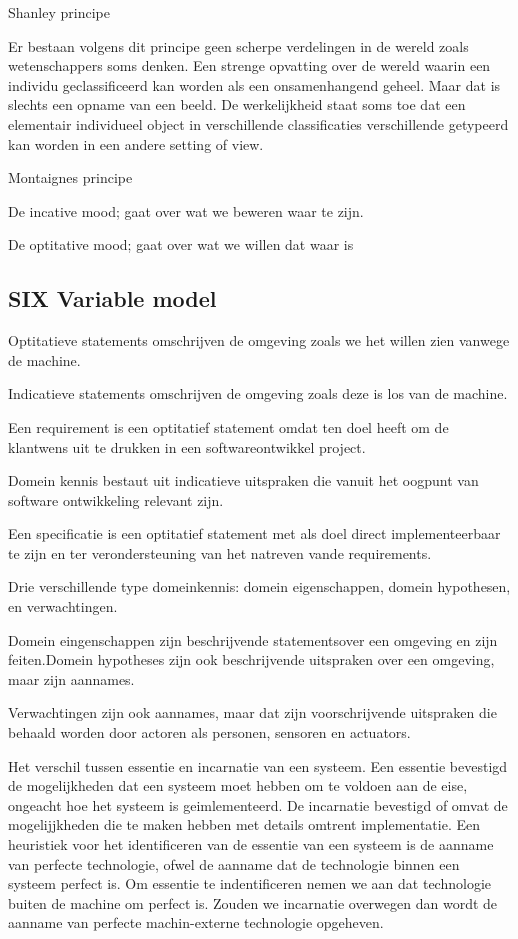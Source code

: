 Shanley principe 

Er bestaan volgens dit principe geen scherpe verdelingen in de wereld zoals wetenschappers soms denken. Een strenge opvatting over de wereld waarin een individu geclassificeerd kan worden als een onsamenhangend geheel. Maar dat is slechts een opname van een beeld. De werkelijkheid staat soms toe dat een elementair individueel object in verschillende classificaties verschillende getypeerd kan worden in een andere setting of view. 

Montaignes principe 

De incative mood; gaat over wat we beweren waar te zijn. 

De optitative mood; gaat over wat we willen dat waar is 
\subsection{SIX Variable model}
Optitatieve statements omschrijven de omgeving zoals we het willen zien vanwege de machine. 

Indicatieve statements omschrijven de omgeving zoals deze is los van de machine. 

Een requirement is een optitatief statement omdat ten doel heeft om de klantwens uit te drukken in een softwareontwikkel project. 

Domein kennis bestaut uit indicatieve uitspraken die vanuit het oogpunt van software ontwikkeling relevant zijn. 

Een specificatie is een optitatief statement met als doel direct implementeerbaar te zijn en ter verondersteuning van het natreven vande requirements. 

Drie verschillende type domeinkennis: domein eigenschappen, domein hypothesen, en verwachtingen. 

Domein eingenschappen  zijn beschrijvende statementsover een omgeving en zijn feiten.Domein hypotheses  zijn ook beschrijvende uitspraken over een omgeving, maar zijn aannames. 

Verwachtingen zijn ook aannames, maar dat zijn voorschrijvende uitspraken die behaald worden door actoren als personen, sensoren en actuators. 

Het verschil tussen essentie en incarnatie van een systeem. Een essentie bevestigd de  mogelijkheden dat een systeem moet hebben om te voldoen aan de eise, ongeacht hoe het systeem is geimlementeerd. De incarnatie bevestigd of omvat de mogelijjkheden die te maken hebben met details omtrent implementatie. Een heuristiek voor het identificeren van de essentie van een systeem is de aanname van perfecte technologie, ofwel de aanname dat de technologie binnen een systeem perfect is. Om essentie te indentificeren nemen we aan dat technologie buiten de machine om perfect is. Zouden we incarnatie overwegen dan wordt de aanname van perfecte machin-externe technologie opgeheven. 

